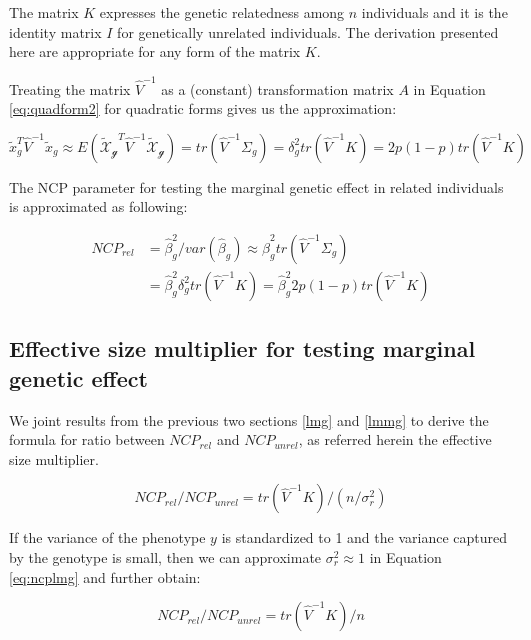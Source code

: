 \documentclass[]{book}
\theoremstyle{definition}
\theoremstyle{definition}
\theoremstyle{definition}
\theoremstyle{remark}
\begin{document}
The matrix \(K\) expresses the genetic relatedness among \(n\)
individuals and it is the identity matrix \(I\) for genetically
unrelated individuals. The derivation presented here are appropriate for
any form of the matrix \(K\).

Treating the matrix \(\hat{V}^{-1}\) as a (constant) transformation
matrix \(A\) in Equation \eqref{eq:quadform2} for quadratic forms gives us
the approximation:

\begin{equation} 
\tilde{x}_g^T \hat{V}^{-1} \tilde{x}_g \approx E(\mathcal{\tilde{X}_g}^T \hat{V}^{-1} \mathcal{\tilde{X}_g}) = tr(\hat{V}^{-1} \Sigma_g) = \delta_g^2 tr(\hat{V}^{-1} K) = 2 p (1 - p) tr(\hat{V}^{-1} K)
\label{eq:varbetahatlmmg}
\end{equation}

The NCP parameter for testing the marginal genetic effect in related
individuals is approximated as following:

\begin{equation} 
\begin{split}
NCP_{rel} & = \hat{\beta}_g^2 / var(\hat{\beta}_g) \approx \hat{\beta}_g^2 tr(\hat{V}^{-1} \Sigma_g) \\
 & = \hat{\beta}_g^2 \delta_g^2 tr(\hat{V}^{-1} K) = \hat{\beta}_g^2 2 p (1 - p) tr(\hat{V}^{-1} K)
\end{split}
\label{eq:ncplmg}
\end{equation}

\subsection{Effective size multiplier for testing marginal genetic
effect}\label{trfg}

We joint results from the previous two sections \ref{lmg} and \ref{lmmg}
to derive the formula for ratio between \(NCP_{rel}\) and
\(NCP_{unrel}\), as referred herein the effective size multiplier.

\begin{equation} 
NCP_{rel} / NCP_{unrel} =  tr(\hat{V}^{-1} K) / (n / \sigma^2_r)
\label{eq:ncpratio}
\end{equation}

If the variance of the phenotype \(y\) is standardized to 1 and the
variance captured by the genotype is small, then we can approximate
\(\sigma_r^2 \approx 1\) in Equation \eqref{eq:ncplmg} and further obtain:

\begin{equation} 
NCP_{rel} / NCP_{unrel} = tr(\hat{V}^{-1} K) / n
\label{eq:ncpratiosc}
\end{equation}
\end{document}
